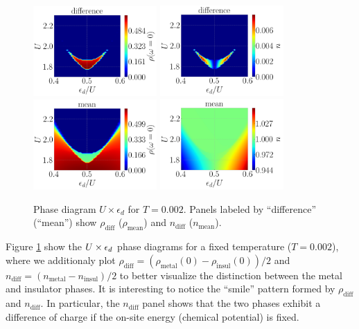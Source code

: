 \documentclass[12pt]{report}
\begin{document}
\begin{figure}[H]
\includegraphics[width=0.42\textwidth]{fig/dmft/fig_diffe-w0-T0002.png}
\hfill
\includegraphics[width=0.42\textwidth]{fig/dmft/fig_diffe-nn-T0002.png}
\includegraphics[width=0.42\textwidth]{fig/dmft/fig_mean2-w0-T0002.png}
\hfill
\includegraphics[width=0.42\textwidth]{fig/dmft/fig_mean2-nn-T0002.png}
\caption{Phase diagram  $U \times \epsilon_d$ for $T=0.002$. Panels labeled by ``difference'' (``mean'') show $\rho_{\text{diff}}$ ($\rho_{\text{mean}}$) and $n_{\text{diff}}$ ($n_{\text{mean}}$).}
\label{fig:Diagram_Drho_U_ed_T0002}
\end{figure}

Figure \ref{fig:Diagram_Drho_U_ed_T0002} show the $U \times \epsilon_d$ phase diagrams for a fixed temperature ($T = 0.002$), where we additionaly plot $\rho_{\text{diff}} = (\rho_{\text{metal}}(0) - \rho_{\text{insul}}(0))/2$ and $n_{\text{diff}} = (n_{\text{metal}} - n_{\text{insul}})/2$ to better visualize the distinction between the metal and insulator phases. It is interesting to notice the ``smile'' pattern formed by $\rho_{\text{diff}}$ and $n_{\text{diff}}$. In particular, the $n_{\text{diff}}$ panel shows that the two phases exhibit a difference of charge if the on-site energy (chemical potential) is fixed.
\end{document}
